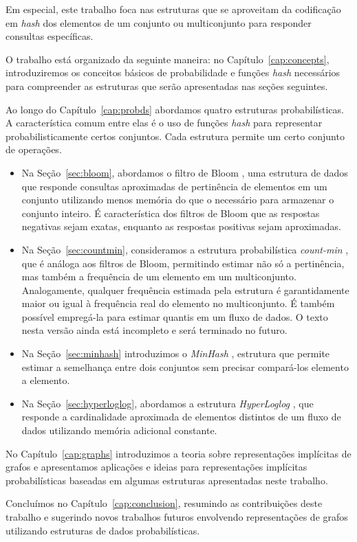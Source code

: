 Em especial, este trabalho foca nas estruturas que se aproveitam da codificação em \emph{hash} dos elementos de um conjunto ou multiconjunto para responder consultas específicas.

O trabalho está organizado da seguinte maneira: no Capítulo~\ref{cap:concepts}, introduziremos os conceitos básicos de probabilidade e funções \emph{hash} necessários para compreender as estruturas que serão apresentadas nas seções seguintes.

Ao longo do Capítulo~\ref{cap:probds} abordamos quatro estruturas probabilísticas. A característica comum entre elas é o uso de funções \emph{hash} para representar probabilisticamente certos conjuntos. Cada estrutura permite um certo conjunto de operações.

\begin{itemize}
  \item Na Seção~\ref{sec:bloom}, abordamos o filtro de Bloom \cite{bloom1970space}, uma estrutura de dados que responde consultas aproximadas de pertinência de elementos em um conjunto utilizando menos memória do que o necessário para armazenar o conjunto inteiro. É característica dos filtros de Bloom que as respostas negativas sejam exatas, enquanto as respostas positivas sejam aproximadas.
  
  \item Na Seção~\ref{sec:countmin}, consideramos a estrutura probabilística \emph{count-min} \cite{cormode2005improved}, que é análoga aos filtros de Bloom, permitindo estimar não só a pertinência, mas também a frequência de um elemento em um multiconjunto. Analogamente, qualquer frequência estimada pela estrutura é garantidamente maior ou igual à frequência real do elemento no multiconjunto. É também possível empregá-la para estimar quantis em um fluxo de dados. O texto nesta versão ainda está incompleto e será terminado no futuro.
  
  \item Na Seção~\ref{sec:minhash} introduzimos o \emph{MinHash} \cite{broder1997resemblance}, estrutura que permite estimar a semelhança entre dois conjuntos sem precisar compará-los elemento a elemento.
  
  \item Na Seção~\ref{sec:hyperloglog}, abordamos a estrutura \emph{HyperLoglog} \cite{flajolet2008hyperloglog}, que responde a cardinalidade aproximada de elementos distintos de um fluxo de dados utilizando memória adicional constante.
\end{itemize}

No Capítulo~\ref{cap:graphs} introduzimos a teoria sobre representações implícitas de grafos e apresentamos aplicações e ideias para representações implícitas probabilísticas baseadas em algumas estruturas apresentadas neste trabalho.

Concluímos no Capítulo~\ref{cap:conclusion}, resumindo as contribuições deste trabalho e sugerindo novos trabalhos futuros envolvendo representações de grafos utilizando estruturas de dados probabilísticas.


